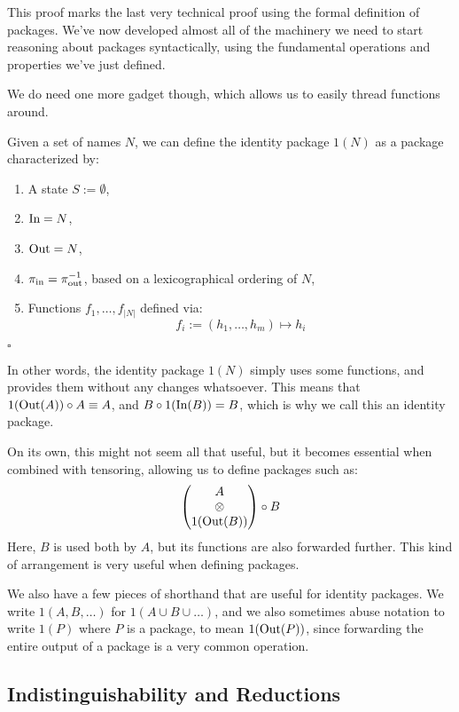 This proof marks the last very technical proof using the formal definition
of packages.
We've now developed almost all of the machinery we need to start
reasoning about packages syntactically, using the fundamental
operations and properties we've just defined.

We do need one more gadget though, which allows us to easily
thread functions around.

\begin{definition}
    Given a set of names $N$, we can define the identity package
    $1(N)$ as a package characterized by:
    \begin{enumerate}
        \item A state $S := \emptyset$,
        \item $\text{In} = N$,
        \item $\text{Out} = N$,
        \item $\pi_{\text{in}} = \pi_{\text{out}}^{-1}$, based on a lexicographical
        ordering of $N$,
        \item Functions $f_1, \ldots, f_{|N|}$ defined via:
        $$
        f_i := (h_1, \ldots, h_m) \mapsto h_i
        $$
    \end{enumerate}

    $\square$
\end{definition}

In other words, the identity package $1(N)$ simply uses some functions,
and provides them without any changes whatsoever.
This means that $1(\text{Out}(A)) \circ A \equiv A$,
and $B \circ 1(\text{In}(B)) = B$, which is why we call this an identity
package.

On its own, this might not seem all that useful, but it becomes essential
when combined with tensoring, allowing us to define packages such as:
$$
\begin{pmatrix}
    A\cr
    \otimes\cr
    1(\text{Out}(B))
\end{pmatrix}
\circ B
$$
Here, $B$ is used both by $A$, but its functions are also forwarded further.
This kind of arrangement is very useful when defining packages.

We also have a few pieces of shorthand that are useful for identity packages.
We write $1(A, B, \ldots)$ for $1(A \cup B \cup \ldots)$,
and we also sometimes abuse notation to write
$1(P)$ where $P$ is a package, to mean $1(\text{Out}(P))$,
since forwarding the entire output of a package is a very common operation.

\subsection{Indistinguishability and Reductions}

